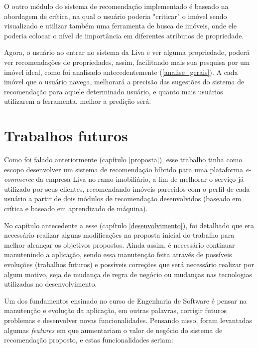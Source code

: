O outro módulo do sistema de recomendação implementado é baseado na abordagem de crítica, na qual o usuário poderia "criticar" o imóvel sendo visualizado e utilizar também uma ferramenta de busca de imóveis, onde ele poderia colocar o nível de importância em diferentes atributos de propriedade.

Agora, o usuário ao entrar no sistema da Liva e ver alguma propriedade, poderá ver recomendações de propriedades, assim, facilitando mais sua pesquisa por um imóvel ideal, como foi analisado antecedentemente (\ref{analise_gerais}). A cada imóvel que o usuário navega, melhorará a precisão das sugestões do sistema de recomendação para aquele determinado usuário, e quanto mais usuários utilizarem a ferramenta, melhor a predição será.

\section{Trabalhos futuros}

Como foi falado anteriormente (capítulo \ref{proposta}), esse trabalho tinha como escopo desenvolver um sistema de recomendação híbrido para uma plataforma \textit{e-commerce} da empresa Liva no ramo imobiliário, a fim de melhorar o serviço já utilizado por seus clientes, recomendando imóveis parecidos com o perfil de cada usuário a partir de dois módulos de recomendação desenvolvidos (baseado em crítica e baseado em aprendizado de máquina).

No capítulo antecedente a esse (capítulo \ref{desenvolvimento}), foi detalhado que era necessário realizar alguns modificações na proposta inicial do trabalho para melhor alcançar os objetivos propostos. Ainda assim, é necessário continuar manutenindo a aplicação, sendo essa manutenção feita através de possíveis evoluções (trabalhos futuros) e possíveis correções que será necessário realizar por algum motivo, seja de mudança de regra de negócio ou mudanças nas tecnologias utilizadas no desenvolvimento.

Um dos fundamentos ensinado no curso de Engenharia de Software é pensar na manutenção e evolução da aplicação, em outras palavras, corrigir futuros problemas e desenvolver novas funcionalidades. Pensando nisso, foram levantadas algumas \textit{features} em que aumentariam o valor de negócio do sistema de recomendação proposto, e estas funcionalidades seriam:


